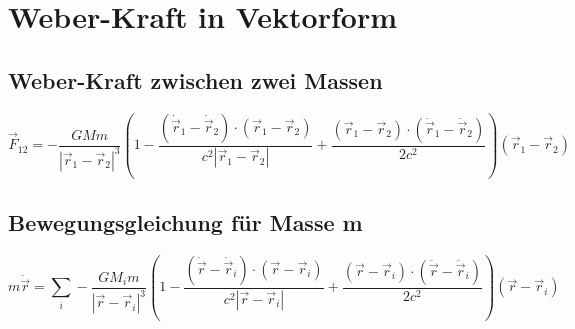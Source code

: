 \section{Weber-Kraft in Vektorform}

\subsection*{Weber-Kraft zwischen zwei Massen}
\begin{equation}
\vec{F}_{12} = -\frac{GMm}{|\vec{r}_1-\vec{r}_2|^3}\left(
1 - \frac{(\dot{\vec{r}}_1-\dot{\vec{r}}_2)\cdot(\vec{r}_1-\vec{r}_2)}{c^2|\vec{r}_1-\vec{r}_2|} + \frac{(\vec{r}_1-\vec{r}_2)\cdot(\ddot{\vec{r}}_1-\ddot{\vec{r}}_2)}{2c^2}
\right)(\vec{r}_1-\vec{r}_2)
\end{equation}

\subsection*{Bewegungsgleichung für Masse m}
\begin{equation}
m\ddot{\vec{r}} = \sum_{i} -\frac{GM_i m}{|\vec{r}-\vec{r}_i|^3}\left(
1 - \frac{(\dot{\vec{r}}-\dot{\vec{r}}_i)\cdot(\vec{r}-\vec{r}_i)}{c^2|\vec{r}-\vec{r}_i|} + \frac{(\vec{r}-\vec{r}_i)\cdot(\ddot{\vec{r}}-\ddot{\vec{r}}_i)}{2c^2}
\right)(\vec{r}-\vec{r}_i)
\end{equation}